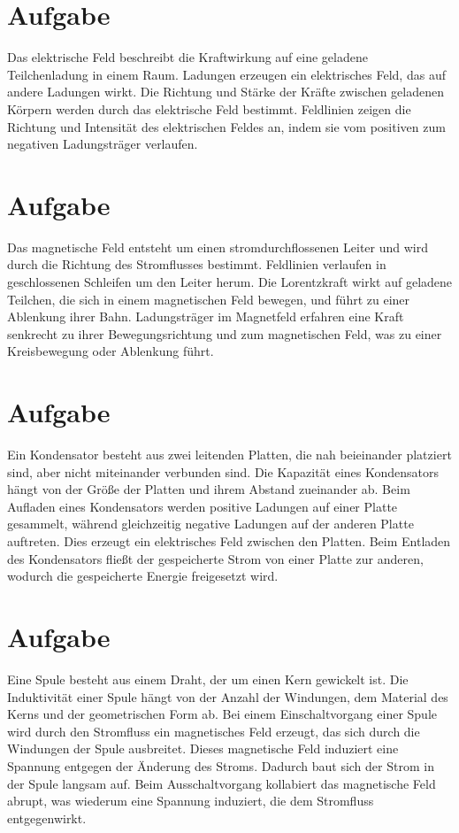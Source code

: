 \documentclass[12pt,a4paper]{report}
\begin{document}
	\thispagestyle{empty}
	\section{Aufgabe}
	Das elektrische Feld beschreibt die Kraftwirkung auf eine geladene Teilchenladung in einem Raum.
	Ladungen erzeugen ein elektrisches Feld, das auf andere Ladungen wirkt.
	Die Richtung und Stärke der Kräfte zwischen geladenen Körpern werden durch das elektrische Feld bestimmt.
	Feldlinien zeigen die Richtung und Intensität des elektrischen Feldes an, indem sie vom positiven zum negativen Ladungsträger verlaufen.
	\section{Aufgabe}
	Das magnetische Feld entsteht um einen stromdurchflossenen Leiter und wird durch die Richtung des Stromflusses bestimmt.
	Feldlinien verlaufen in geschlossenen Schleifen um den Leiter herum.
	Die Lorentzkraft wirkt auf geladene Teilchen, die sich in einem magnetischen Feld bewegen, und führt zu einer Ablenkung ihrer Bahn.
	Ladungsträger im Magnetfeld erfahren eine Kraft senkrecht zu ihrer Bewegungsrichtung und zum magnetischen Feld, was zu einer Kreisbewegung oder Ablenkung führt.
	\section{Aufgabe}
	Ein Kondensator besteht aus zwei leitenden Platten, die nah beieinander platziert sind, aber nicht miteinander verbunden sind.
	Die Kapazität eines Kondensators hängt von der Größe der Platten und ihrem Abstand zueinander ab.
	Beim Aufladen eines Kondensators werden positive Ladungen auf einer Platte gesammelt, während gleichzeitig negative Ladungen auf der anderen Platte auftreten.
	Dies erzeugt ein elektrisches Feld zwischen den Platten.
	Beim Entladen des Kondensators fließt der gespeicherte Strom von einer Platte zur anderen, wodurch die gespeicherte Energie freigesetzt wird.
	\section{Aufgabe}
	Eine Spule besteht aus einem Draht, der um einen Kern gewickelt ist.
	Die Induktivität einer Spule hängt von der Anzahl der Windungen, dem Material des Kerns und der geometrischen Form ab.
	Bei einem Einschaltvorgang einer Spule wird durch den Stromfluss ein magnetisches Feld erzeugt, das sich durch die Windungen der Spule ausbreitet.
	Dieses magnetische Feld induziert eine Spannung entgegen der Änderung des Stroms.
	Dadurch baut sich der Strom in der Spule langsam auf.
	Beim Ausschaltvorgang kollabiert das magnetische Feld abrupt, was wiederum eine Spannung induziert, die dem Stromfluss entgegenwirkt.
\end{document}
